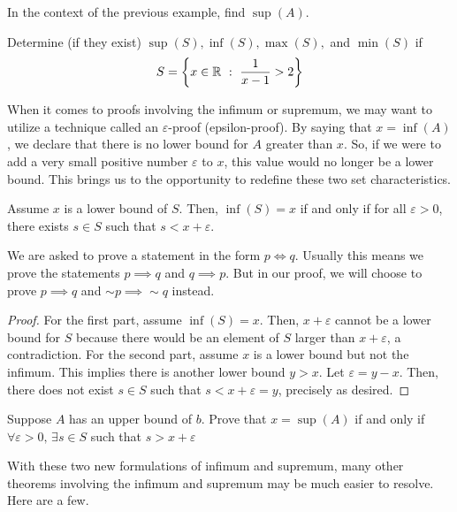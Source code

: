 \begin{exercise}
    In the context of the previous example, find $\sup(A)$. 
\end{exercise}

\begin{exercise}
    Determine (if they exist)  $\sup(S),\inf(S),\max(S),$ and $\min(S)$ if \[S=\left\{x\in\R\ : \ \frac{1}{x-1}>2\right\}\]
\end{exercise}

When it comes to proofs involving the infimum or supremum, we may want to utilize a technique called an $\varepsilon$-proof (epsilon-proof). By saying that $x=\inf(A)$, we declare that there is no lower bound for $A$ greater than $x$. So, if we were to add a very small positive number $\varepsilon$ to $x$, this value would no longer be a lower bound. This brings us to the opportunity to redefine these two set characteristics. \\

\begin{theorem}
    Assume $x$ is a lower bound of $S$. Then, $\inf(S)=x$ if and only if for all $\varepsilon>0$, there exists $s\in S$ such that $s<x+\varepsilon$.
\end{theorem}

We are asked to prove a statement in the form $p\iff q$. Usually this means we prove the statements $p\implies q$ and $q \implies p$. But in our proof, we will choose to prove $p\implies q$ and $\sim p \implies \sim q$ instead. 

\begin{proof}
     For the first part, assume $\inf(S)=x$. Then, $x+\varepsilon$ cannot be a lower bound for $S$ because there would be an element of $S$ larger than $x+\varepsilon$, a contradiction. For the second part, assume $x$ is a lower bound but not the infimum. This implies there is another lower bound $y>x$. Let $\varepsilon=y-x$. Then, there does not exist $s\in S$ such that $s<x+\varepsilon=y$, precisely as desired. 
\end{proof}

\begin{exercise}
    Suppose $A$ has an upper bound of $b$. Prove that $x=\sup(A)$ if and only if $\forall\varepsilon>0,\, \exists s\in S$ such that $s>x+\varepsilon$
\end{exercise}

With these two new formulations of infimum and supremum, many other theorems involving the infimum and supremum may be much easier to resolve. Here are a few.\\

